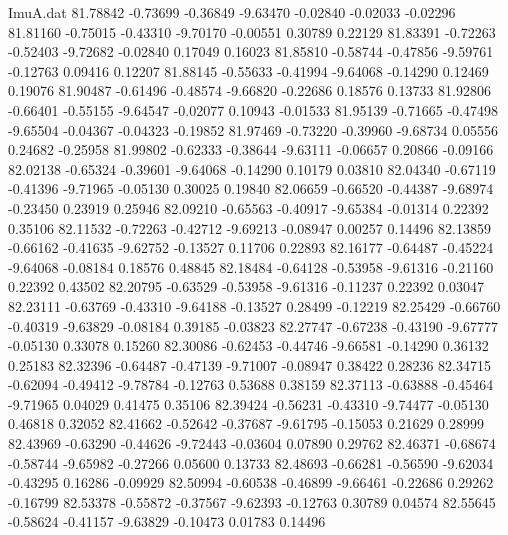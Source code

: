 \begin{filecontents}{ImuA.dat}
  81.78842   -0.73699   -0.36849   -9.63470   -0.02840   -0.02033   -0.02296
  81.81160   -0.75015   -0.43310   -9.70170   -0.00551    0.30789    0.22129
  81.83391   -0.72263   -0.52403   -9.72682   -0.02840    0.17049    0.16023
  81.85810   -0.58744   -0.47856   -9.59761   -0.12763    0.09416    0.12207
  81.88145   -0.55633   -0.41994   -9.64068   -0.14290    0.12469    0.19076
  81.90487   -0.61496   -0.48574   -9.66820   -0.22686    0.18576    0.13733
  81.92806   -0.66401   -0.55155   -9.64547   -0.02077    0.10943   -0.01533
  81.95139   -0.71665   -0.47498   -9.65504   -0.04367   -0.04323   -0.19852
  81.97469   -0.73220   -0.39960   -9.68734    0.05556    0.24682   -0.25958
  81.99802   -0.62333   -0.38644   -9.63111   -0.06657    0.20866   -0.09166
  82.02138   -0.65324   -0.39601   -9.64068   -0.14290    0.10179    0.03810
  82.04340   -0.67119   -0.41396   -9.71965   -0.05130    0.30025    0.19840
  82.06659   -0.66520   -0.44387   -9.68974   -0.23450    0.23919    0.25946
  82.09210   -0.65563   -0.40917   -9.65384   -0.01314    0.22392    0.35106
  82.11532   -0.72263   -0.42712   -9.69213   -0.08947    0.00257    0.14496
  82.13859   -0.66162   -0.41635   -9.62752   -0.13527    0.11706    0.22893
  82.16177   -0.64487   -0.45224   -9.64068   -0.08184    0.18576    0.48845
  82.18484   -0.64128   -0.53958   -9.61316   -0.21160    0.22392    0.43502
  82.20795   -0.63529   -0.53958   -9.61316   -0.11237    0.22392    0.03047
  82.23111   -0.63769   -0.43310   -9.64188   -0.13527    0.28499   -0.12219
  82.25429   -0.66760   -0.40319   -9.63829   -0.08184    0.39185   -0.03823
  82.27747   -0.67238   -0.43190   -9.67777   -0.05130    0.33078    0.15260
  82.30086   -0.62453   -0.44746   -9.66581   -0.14290    0.36132    0.25183
  82.32396   -0.64487   -0.47139   -9.71007   -0.08947    0.38422    0.28236
  82.34715   -0.62094   -0.49412   -9.78784   -0.12763    0.53688    0.38159
  82.37113   -0.63888   -0.45464   -9.71965    0.04029    0.41475    0.35106
  82.39424   -0.56231   -0.43310   -9.74477   -0.05130    0.46818    0.32052
  82.41662   -0.52642   -0.37687   -9.61795   -0.15053    0.21629    0.28999
  82.43969   -0.63290   -0.44626   -9.72443   -0.03604    0.07890    0.29762
  82.46371   -0.68674   -0.58744   -9.65982   -0.27266    0.05600    0.13733
  82.48693   -0.66281   -0.56590   -9.62034   -0.43295    0.16286   -0.09929
  82.50994   -0.60538   -0.46899   -9.66461   -0.22686    0.29262   -0.16799
  82.53378   -0.55872   -0.37567   -9.62393   -0.12763    0.30789    0.04574
  82.55645   -0.58624   -0.41157   -9.63829   -0.10473    0.01783    0.14496

\end{filecontents}
